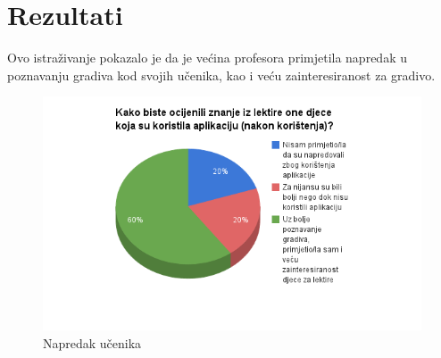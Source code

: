 \documentclass{scrreprt}
\begin{document}


\chapter{Rezultati}

Ovo istraživanje pokazalo je da je većina profesora primjetila napredak u
poznavanju gradiva kod svojih učenika, kao i veću zainteresiranost za gradivo.

\begin{figure}[H]
  \includegraphics[width=\textwidth, clip=true, trim=0 2.5cm 0 0]{advance}
  \caption{Napredak učenika}
\end{figure}
\end{document}
